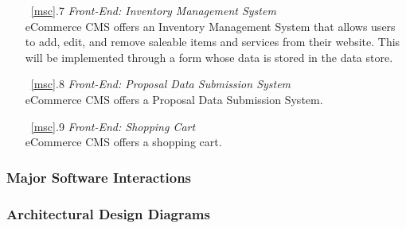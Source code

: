 \documentclass{article}
\newcommand{\br}{\vspace{2mm}}
\begin{document}
\begin{enumerate}
    \item[~\ref{msc}.7 ] \emph{Front-End: Inventory Management System}\br\\
        eCommerce CMS offers an Inventory Management System that allows users to
        add, edit, and remove saleable items and services from their website.  This
        will be implemented through a form whose data is stored in the data
        store.
    \item[~\ref{msc}.8 ] \emph{Front-End: Proposal Data Submission System}\br\\
        eCommerce CMS offers a Proposal Data Submission System.
    \item[~\ref{msc}.9 ] \emph{Front-End: Shopping Cart}\br\\
        eCommerce CMS offers a shopping cart.
\end{enumerate}


\subsubsection{Major Software Interactions}
\label{msi}


\subsubsection{Architectural Design Diagrams}
\label{add}

\end{document}
